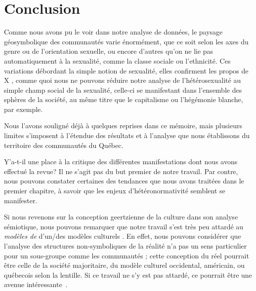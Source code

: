 \chapter*{Conclusion}         %


Comme nous avons pu le voir dans notre analyse de données, le paysage géosymbolique des communautés \lgbt{} varie énormément, que ce soit selon les axes du genre ou de l'orientation sexuelle, ou encore d'autres qu'on ne lie pas automatiquement à la sexualité, comme la classe sociale ou l'ethnicité.
Ces variations débordant la simple notion de sexualité, elles confirment les propos de X , comme quoi nous ne pouvons réduire notre analyse de l'hétérosexualité au simple champ social de la sexualité, celle-ci se manifestant dans l'ensemble des sphères de la société, au même titre que le capitalisme ou l'hégémonie blanche, par exemple.


Nous l'avons souligné déjà à quelques reprises dans ce mémoire, mais plusieurs limites s'imposent à l'étendue des résultats et à l'analyse que nous établissons du territoire des communautés \lgbt{} du Québec.

Y'a-t-il une place à la critique des différentes manifestations dont nous avons effectué la revue?
Il ne s'agit pas du but premier de notre travail.
Par contre, nous pouvons constater certaines des tendances que nous avons traitées dans le premier chapitre, à savoir que les enjeux d'hétéronormativité semblent se manifester.

Si nous revenons sur la conception geertzienne de la culture dans son analyse sémiotique, nous pouvons remarquer que notre travail s'est très peu attardé au \emph{modèles de} d'un/des modèles culturels \lgbt{}.
En effet, nous pouvons considérer  que l'analyse des structures non-symboliques de la réalité n'a pas un sens particulier pour un sous-groupe comme les communautés \lgbt{}; cette conception du réel pourrait être celle de la société majoritaire, du modèle culturel occidental, américain, ou québecois selon la lentille.
Si ce travail ne s'y est pas attardé, ce pourrait être une avenue intéressante~.

